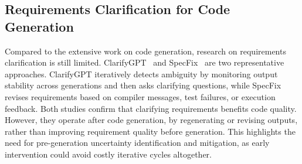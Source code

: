 

\subsection{Requirements Clarification for Code Generation}
Compared to the extensive work on code generation, research on requirements clarification is still limited. ClarifyGPT~\cite{mu2024clarifygpt} and SpecFix~\cite{jia2025specfix} are two representative approaches. ClarifyGPT iteratively detects ambiguity by monitoring output stability across generations and then asks clarifying questions, while SpecFix revises requirements based on compiler messages, test failures, or execution feedback. Both studies confirm that clarifying requirements benefits code quality. However, they operate after code generation, by regenerating or revising outputs, rather than improving requirement quality before generation. This highlights the need for pre-generation uncertainty identification and mitigation, as early intervention could avoid costly iterative cycles altogether.

